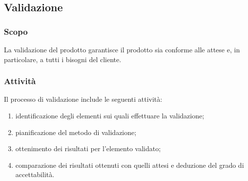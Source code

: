 \subsection{Validazione}
\subsubsection{Scopo}
La validazione del prodotto garantisce il prodotto sia conforme alle attese e, in particolare, a tutti i bisogni del cliente.

\subsubsection{Attività}
Il processo di validazione include le seguenti attività:
\begin{enumerate}
	\item identificazione degli elementi sui quali effettuare la validazione;
	\item pianificazione del metodo di validazione;
	\item ottenimento dei risultati per l'elemento validato;
	\item comparazione dei risultati ottenuti con quelli attesi e deduzione del grado di accettabilità.
\end{enumerate}